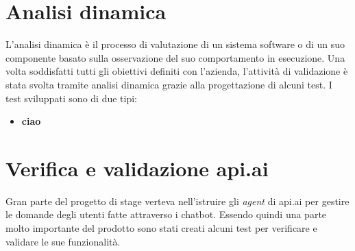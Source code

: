 \section{Analisi dinamica}
L’analisi dinamica è il processo di valutazione di un sistema software o di un suo componente basato sulla osservazione del suo comportamento in esecuzione. Una volta soddisfatti tutti gli obiettivi definiti con l’azienda, l’attività di validazione è stata svolta tramite analisi dinamica grazie alla progettazione di alcuni test. I test sviluppati sono di due tipi:
\begin{itemize}
	\item \textbf{ciao}
\end{itemize}

\section{Verifica e validazione api.ai}
Gran parte del progetto di stage verteva nell'istruire gli \emph{agent} di api.ai per gestire le domande degli utenti fatte attraverso i \gls{chatbot}. Essendo quindi una parte molto importante del prodotto sono stati creati alcuni test per verificare e validare le sue funzionalità. 
